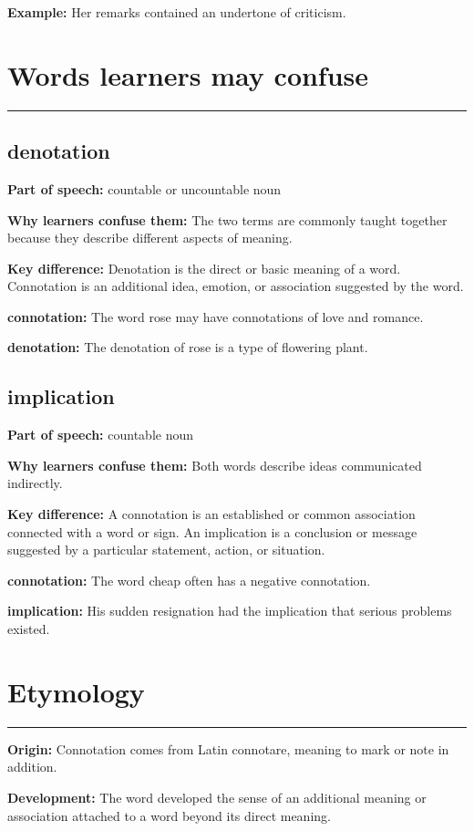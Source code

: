 \documentclass[11pt]{article}
\newcommand{\sectionrule}{\par\vspace{-0.5em}\noindent\textcolor{Accent}{\rule{\linewidth}{0.6pt}}\par}
\begin{document}
\textbf{Example:} Her remarks contained an undertone of criticism.

\section{Words learners may confuse}
\sectionrule
\subsection{denotation}
\textbf{Part of speech:} countable or uncountable noun

\textbf{Why learners confuse them:} The two terms are commonly taught together because they describe different aspects of meaning.

\textbf{Key difference:} Denotation is the direct or basic meaning of a word. Connotation is an additional idea, emotion, or association suggested by the word.

\textbf{connotation:} The word rose may have connotations of love and romance.

\textbf{denotation:} The denotation of rose is a type of flowering plant.

\subsection{implication}
\textbf{Part of speech:} countable noun

\textbf{Why learners confuse them:} Both words describe ideas communicated indirectly.

\textbf{Key difference:} A connotation is an established or common association connected with a word or sign. An implication is a conclusion or message suggested by a particular statement, action, or situation.

\textbf{connotation:} The word cheap often has a negative connotation.

\textbf{implication:} His sudden resignation had the implication that serious problems existed.

\section{Etymology}
\sectionrule
\textbf{Origin:} Connotation comes from Latin connotare, meaning to mark or note in addition.

\textbf{Development:} The word developed the sense of an additional meaning or association attached to a word beyond its direct meaning.
\end{document}
